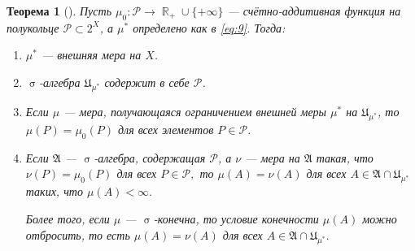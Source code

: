 \documentclass[a4paper]{article}
\theoremstyle{indented}
\newtheorem{theorem}{Теорема}
\theoremstyle{definition}
\theoremstyle{remark}
\DeclareMathOperator{\RR}{\mathbb{R}}
\DeclareMathOperator{\s}{\sigma}
\begin{document}
\begin{theorem}[]
	Пусть $ \mu_0\colon\mathcal{P}\to\RR_+\cup\{+\infty\} $ --- счётно-аддитивная функция на полукольце $ \mathcal{P}\subset 2^X $, а $ \mu^* $ определено как в \eqref{eq:9}. Тогда:
	\begin{enumerate}
		\item $ \mu^* $ --- внешняя мера на $ X $.
		\item $ \s $-алгебра $ \mathfrak{U}_{\mu^*} $ содержит в себе $ \mathcal{P} $. 
		\item Если  $ \mu $ --- мера, получающаяся ограничением внешней меры $ \mu^* $ на $ \mathfrak{U}_{\mu^*} $, то \\ $ \mu(P)=\mu_0(P) $ для всех элементов $ P\in \mathcal{P} $.
		\item Если $ \mathfrak{A} $ --- $ \s $-алгебра, содержащая $ \mathcal{P} $, а $ \nu $ --- мера на $ \mathfrak{A} $ такая, что $ \nu(P)=\mu_0(P) $ для всех $ P\in\mathcal{P}, $
		то 
		$ \mu(A)=\nu(A) $ для всех $ A\in\mathfrak{A}\cap \mathfrak{U}_{\mu^*} $ таких, что $ \mu(A)<\infty. $
		
		Более того, если $\mu $ --- $ \s$-конечна, то условие конечности $ \mu(A) $ можно отбросить, то есть
		$ \mu(A)=\nu(A) $ для всех $ A\in \mathfrak{A}\cap \mathfrak{U}_{\mu^*}. $
	\end{enumerate}
\end{theorem}
\end{document}
